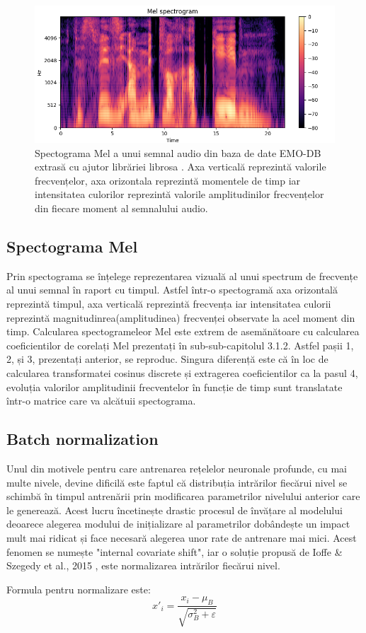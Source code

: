 \documentclass[a4paper,12pt]{book}
\begin{document}
			\begin{figure}[h]
				\centering
				\includegraphics[scale=0.50]{melspectogram}
				\caption{Spectograma Mel a unui semnal audio din baza de date EMO-DB extrasă cu ajutor librăriei librosa \cite{librosa}. Axa verticală reprezintă valorile frecvențelor, axa orizontala reprezintă momentele de timp iar intensitatea culorilor reprezintă valorile amplitudinilor frecvențelor din fiecare moment al semnalului audio.
				}
				\label{fig:melspec}
			\end{figure}
			
			\subsection{Spectograma Mel} \label{mel}
				Prin spectograma se înțelege reprezentarea vizuală al unui spectrum de frecvențe al unui semnal în raport cu timpul. Astfel într-o spectogramă axa orizontală reprezintă timpul, axa verticală reprezintă frecvența iar intensitatea culorii reprezintă magnitudinrea(amplitudinea) frecvenței observate la acel moment din timp. Calcularea spectogrameleor Mel este extrem de asemănătoare cu calcularea coeficientilor de corelați Mel prezentați în sub-sub-capitolul 3.1.2. Astfel pașii 1, 2, și 3, prezentați anterior, se reproduc. Singura diferență este că în loc de calcularea transformatei cosinus discrete și extragerea coeficientilor ca la pasul 4, evoluția valorilor amplitudinii frecventelor în funcție de timp sunt translatate într-o matrice care va alcătuii spectograma. \par
			\subsection{Batch normalization} \label{batch-norn}
				Unul din motivele pentru care antrenarea rețelelor neuronale profunde, cu mai multe nivele, devine dificilă este faptul că distribuția intrărilor fiecărui nivel se schimbă în timpul antrenării prin modificarea parametrilor nivelului anterior care le generează. Acest lucru încetinește drastic procesul de învățare al modelului deoarece alegerea modului de inițializare al parametrilor dobândește un impact mult mai ridicat și face necesară alegerea unor rate de antrenare mai mici. Acest fenomen se numește "internal covariate shift", iar o soluție propusă de Ioffe \& Szegedy et al., 2015 \cite{batch_norm}, este normalizarea intrărilor fiecărui nivel. \par Formula pentru normalizare este:
				\begin{equation*}
					x'_i = \frac{x_i - \mu_B}{\sqrt{\sigma^2_B +  \varepsilon}}
				\end{equation*}
				
\end{document}
